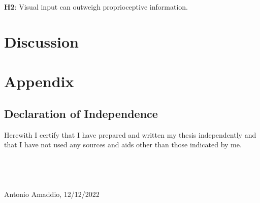 \documentclass[man]{apa7}
\begin{document}
\textbf{H2}: Visual input can outweigh proprioceptive information.

\section{Discussion}

\printbibliography
\newpage
\section{Appendix}

\subsection{Declaration of Independence}

Herewith I certify that I have prepared and written my thesis independently and that I have not used any sources and aids other than those indicated by me. \\
\mbox{}\\
\mbox{}\\
\mbox{}\\
\mbox{}\\
Antonio Amaddio, 12/12/2022
\end{document}
